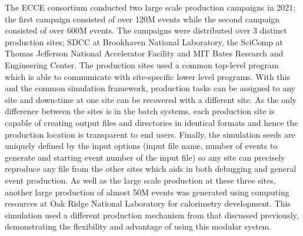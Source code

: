 	The ECCE consortium conducted two large scale production campaigns in 2021; the first campaign consisted of over 120M events while the second campaign consisted of over 600M events. The campaigns were distributed over 3 distinct production sites; SDCC at Brookhaven National Laboratory, the SciComp at Thomas Jefferson National Accelerator Facility and MIT Bates Research and Engineering Center. The production sites used a common top-level program which is able to communicate with site-specific lower level programs. With this and the common simulation framework, production tasks can be assigned to any site and down-time at one site can be recovered with a different site. As the only difference between the sites is in the batch systems, each production site is capable of creating output files and directories in identical formats and hence the production location is transparent to end users. Finally, the simulation seeds are uniquely defined by the input options (input file name, number of events to generate and starting event number of the input file) so any site can precisely reproduce any file from the other sites which aids in both debugging and general event production. As well as the large scale production at these three sites, another large production of almost 50M events was generated using computing resources at Oak Ridge National Laboratory for calorimetry development. This simulation used a different production mechanism from that discussed previously, demonstrating the flexibility and advantage of using this modular system.

